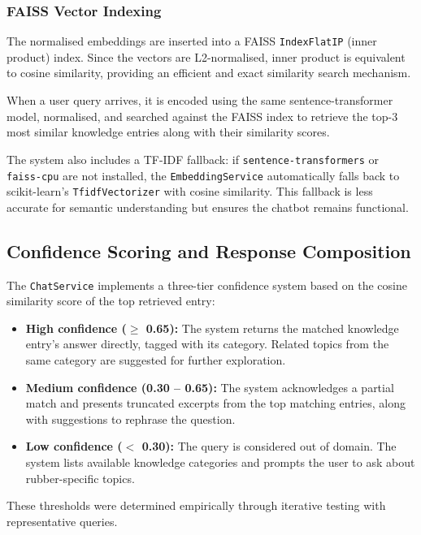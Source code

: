 \subsubsection{FAISS Vector Indexing}

The normalised embeddings are inserted into a FAISS \texttt{IndexFlatIP} (inner product) index. Since the vectors are L2-normalised, inner product is equivalent to cosine similarity, providing an efficient and exact similarity search mechanism.

When a user query arrives, it is encoded using the same sentence-transformer model, normalised, and searched against the FAISS index to retrieve the top-3 most similar knowledge entries along with their similarity scores.

The system also includes a TF-IDF fallback: if \texttt{sentence-transformers} or \texttt{faiss-cpu} are not installed, the \texttt{EmbeddingService} automatically falls back to scikit-learn's \texttt{TfidfVectorizer} with cosine similarity. This fallback is less accurate for semantic understanding but ensures the chatbot remains functional.

\subsection{Confidence Scoring and Response Composition}

The \texttt{ChatService} implements a three-tier confidence system based on the cosine similarity score of the top retrieved entry:

\begin{itemize}
    \item \textbf{High confidence ($\geq$ 0.65):} The system returns the matched knowledge entry's answer directly, tagged with its category. Related topics from the same category are suggested for further exploration.
    \item \textbf{Medium confidence (0.30 -- 0.65):} The system acknowledges a partial match and presents truncated excerpts from the top matching entries, along with suggestions to rephrase the question.
    \item \textbf{Low confidence ($<$ 0.30):} The query is considered out of domain. The system lists available knowledge categories and prompts the user to ask about rubber-specific topics.
\end{itemize}

These thresholds were determined empirically through iterative testing with representative queries.


